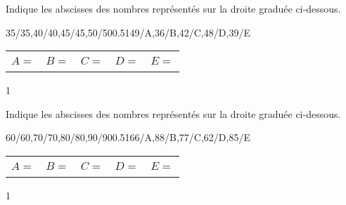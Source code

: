 \documentclass[a4paper,11pt]{report}
\begin{document}
\begin{exop}{
Indique les abscisses des nombres représentés sur la droite graduée ci-dessous.
\vspace{-0.2cm}
\begin{center}
\begin{numberlined}{35}{50}{5}{1}{35/35,40/40,45/45,50/50}{0.5}{1}{49/A,36/B,42/C,48/D,39/E}
\end{numberlined}
\end{center}
\begin{center}
\begin{tabular}{|p{2.5cm}|p{2.5cm}|p{2.5cm}|p{2.5cm}|p{2.5cm}|}\hline
& & & & \\
$A=$&$B=$&$C=$&$D=$&$E=$ \\
& & & & \\\hline
\end{tabular}
\end{center}
\vspace{-0.5cm}
}{1}\end{exop}


\begin{exop}{
Indique les abscisses des nombres représentés sur la droite graduée ci-dessous.
\vspace{-0.2cm}
\begin{center}
\begin{numberlined}{60}{90}{10}{1}{60/60,70/70,80/80,90/90}{0.5}{1}{66/A,88/B,77/C,62/D,85/E}
\end{numberlined}
\end{center}
\begin{center}

\begin{tabular}{|p{2.5cm}|p{2.5cm}|p{2.5cm}|p{2.5cm}|p{2.5cm}|}\hline
& & & & \\
$A=$&$B=$&$C=$&$D=$&$E=$ \\
& & & & \\\hline
\end{tabular}
\end{center}
\vspace{-0.5cm}
}{1}\end{exop}
\end{document}
